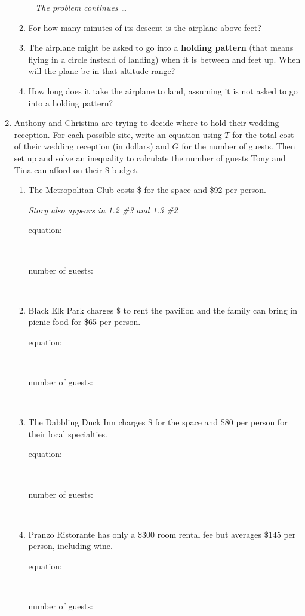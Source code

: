 \begin{enumerate}
\begin{enumerate}
\newpage %
~\hspace{-.5in} \emph{The problem continues \ldots}

\item For how many minutes of its descent is the airplane above  feet? \vfill
\item The airplane might be asked to go into a \textbf{holding pattern} (that means flying in a circle instead of landing) when it is between  and  feet up.  When will the plane be in that altitude range? \vfill
\item How long does it take the airplane to land, assuming it is not asked to go into a holding pattern? \vfill
\end{enumerate}

\newpage %

\item Anthony and Christina are trying to decide where to hold their wedding reception.  For each possible site, write an equation using $T$ for the total cost of their wedding reception (in dollars) and $G$ for the number of guests.  Then set up and solve an inequality to calculate the number of guests Tony and Tina can afford on their \$ budget.  
\begin{enumerate}
\item The Metropolitan Club costs \$ for the space and \$92 per person.
 
\hfill \emph{Story also appears in 1.2 \#3 and 1.3 \#2} \bigskip
\begin{description}
\item [equation:] ~\bigskip 
\item [number of guests:]  ~\vfill 
\end{description}  \bigskip
\item Black Elk Park charges  \$ to rent the pavilion and the family can bring in picnic food for  \$65 per person. \bigskip
\begin{description}
\item [equation:] ~\bigskip 
\item [number of guests:]  ~\vfill 
\end{description}  \bigskip
\item The Dabbling Duck Inn charges  \$ for the space and \$80 per person for their local specialties.  \bigskip
\begin{description}
\item [equation:] ~\bigskip 
\item [number of guests:]  ~\vfill 
\end{description}  \bigskip
\item Pranzo Ristorante has only a \$300 room rental fee but averages \$145 per person, including wine. \bigskip
\begin{description}
\item [equation:] ~\bigskip 
\item [number of guests:]  ~\vfill 
\end{description}  \bigskip
\end{enumerate}


\end{enumerate}
